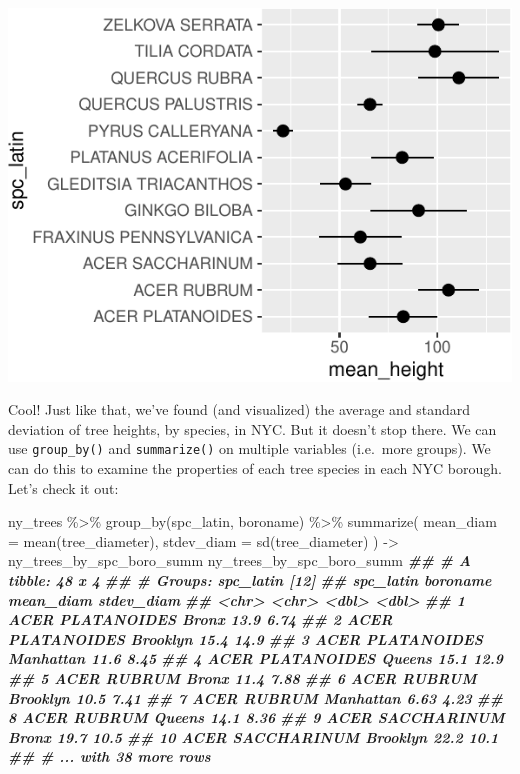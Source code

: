 \documentclass[
]{krantz}
\newenvironment{Shaded}{\begin{snugshade}}{\end{snugshade}}
\newcommand{\AttributeTok}[1]{\textcolor[rgb]{0.77,0.63,0.00}{#1}}
\newcommand{\DocumentationTok}[1]{\textcolor[rgb]{0.56,0.35,0.01}{\textbf{\textit{#1}}}}
\newcommand{\FunctionTok}[1]{\textcolor[rgb]{0.00,0.00,0.00}{#1}}
\newcommand{\NormalTok}[1]{#1}
\newcommand{\OtherTok}[1]{\textcolor[rgb]{0.56,0.35,0.01}{#1}}
\newcommand{\SpecialCharTok}[1]{\textcolor[rgb]{0.00,0.00,0.00}{#1}}
\begin{document}
\begin{center}\includegraphics[width=0.8\linewidth]{index_files/figure-latex/unnamed-chunk-77-1} \end{center}

Cool! Just like that, we've found (and visualized) the average and standard deviation of tree heights, by species, in NYC. But it doesn't stop there. We can use \texttt{group\_by()} and \texttt{summarize()} on multiple variables (i.e.~more groups). We can do this to examine the properties of each tree species in each NYC borough. Let's check it out:

\begin{Shaded}
\begin{Highlighting}[]
\NormalTok{ny\_trees }\SpecialCharTok{\%\textgreater{}\%}
  \FunctionTok{group\_by}\NormalTok{(spc\_latin, boroname) }\SpecialCharTok{\%\textgreater{}\%}
  \FunctionTok{summarize}\NormalTok{(}
    \AttributeTok{mean\_diam =} \FunctionTok{mean}\NormalTok{(tree\_diameter),}
    \AttributeTok{stdev\_diam =} \FunctionTok{sd}\NormalTok{(tree\_diameter)}
\NormalTok{  ) }\OtherTok{{-}\textgreater{}}\NormalTok{ ny\_trees\_by\_spc\_boro\_summ}
\NormalTok{ny\_trees\_by\_spc\_boro\_summ}
\DocumentationTok{\#\# \# A tibble: 48 x 4}
\DocumentationTok{\#\# \# Groups:   spc\_latin [12]}
\DocumentationTok{\#\#    spc\_latin        boroname  mean\_diam stdev\_diam}
\DocumentationTok{\#\#    \textless{}chr\textgreater{}            \textless{}chr\textgreater{}         \textless{}dbl\textgreater{}      \textless{}dbl\textgreater{}}
\DocumentationTok{\#\#  1 ACER PLATANOIDES Bronx         13.9        6.74}
\DocumentationTok{\#\#  2 ACER PLATANOIDES Brooklyn      15.4       14.9 }
\DocumentationTok{\#\#  3 ACER PLATANOIDES Manhattan     11.6        8.45}
\DocumentationTok{\#\#  4 ACER PLATANOIDES Queens        15.1       12.9 }
\DocumentationTok{\#\#  5 ACER RUBRUM      Bronx         11.4        7.88}
\DocumentationTok{\#\#  6 ACER RUBRUM      Brooklyn      10.5        7.41}
\DocumentationTok{\#\#  7 ACER RUBRUM      Manhattan      6.63       4.23}
\DocumentationTok{\#\#  8 ACER RUBRUM      Queens        14.1        8.36}
\DocumentationTok{\#\#  9 ACER SACCHARINUM Bronx         19.7       10.5 }
\DocumentationTok{\#\# 10 ACER SACCHARINUM Brooklyn      22.2       10.1 }
\DocumentationTok{\#\# \# ... with 38 more rows}
\end{Highlighting}
\end{Shaded}
\end{document}
